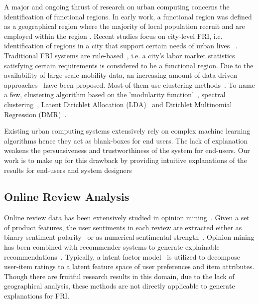 \documentclass[runningheads]{llncs}
\begin{document}
A major and ongoing thrust of research on urban computing concerns the identification of functional regions. In early work, a functional region was defined as a geographical region where the majority of local population recruit and are employed within the region \cite{Ball1980Definition}. Recent studies focus on city-level FRI, i.e. identification of regions in a city that support certain needs of urban lives ~\cite{Yuan2012FunctionRegion,Yuan2015FunctionRegion}. Traditional FRI systems are rule-based~\cite{Ball1980Definition}, i.e. a city's labor market statistics satisfying certain requirements is considered to be a functional region. Due to the availability of large-scale mobility data, an increasing amount of data-driven approaches~\cite{Farmer2009Overview} have been proposed.
Most of them use clustering methods~\cite{Karlsson2006FunctionalRegionSummary}. To name a few, clustering algorithm based on the 'modularity function'~\cite{Newman2004ModularityFunction,Ratti2010Telecom}, spectral clustering~\cite{Vatsavai2011Remote}, Latent Dirichlet Allocation (LDA)~\cite{Vatsavai2010Remote} and Dirichlet Multinomial Regression (DMR)~\cite{Yuan2012FunctionRegion,Yuan2015FunctionRegion}.

Existing urban computing systems extensively rely on complex machine learning algorithms hence they act as blank-boxes for end users.
The lack of explanation weakens the persuasiveness and trustworthiness of the system for end-users.
Our work is to make up for this drawback by providing intuitive explanations of the results for end-users and system designers

\subsection{Online Review Analysis}
Online review data has been extensively studied in opinion mining~\cite{}. Given a set of product features, the user sentiments in each review are extracted either as binary sentiment polarity~\cite{} or as numerical sentimental strength~\cite{}. Opinion mining has been combined with recommender systems to generate explainable recommendations~\cite{}. Typically, a latent factor model~\cite{} is utilized to decompose user-item ratings to a latent feature space of user preferences and item attributes. Though there are fruitful research results in this domain, due to the lack of geographical analysis, these methods are not directly applicable to generate explanations for FRI.
\end{document}
